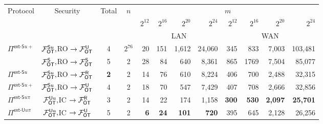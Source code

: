 \begin{figure*}[t!]\centering
	\begin{tabular}{|l||c|c|c || r | r|  r |r |r|r |r|r|}
		\hline
		\multirow{3}{*}{Protocol}  &         \multirow{3}{*}{Security}          & \multirow{3}{*}{Total} & \multirow{3}{*}{$n$} &                                     \multicolumn{8}{c|}{$m$}                                     \\
		                           &                                            &                        &                      & $2^{12}$ & $2^{16}$ & $2^{20}$ & $2^{24}$  & $2^{12}$  &  $2^{16}$ & $2^{20}$    &      $2^{24}$ \\ \cline{5-12}
		                           &                                            &         Rounds         &                      &          \multicolumn{4}{c|}{LAN}          &              \multicolumn{4}{c|}{WAN}               \\ \hline\hline
		$\Pi^{\textsf{ext-S}u+}$   &  $\mathcal{F}_{\mathsf{OT}}^{\mathsf{S} u},$RO $\rightarrow\mathcal{F}_{\mathsf{OT}}^\mathsf{U}$  &           4            &       $2^{76}$       & 20       & 151      & 1,612    & 24,060    & 345       &       833 & 7,003       &       103,481 \\ \hline\hline
		\cite{C:KelOrsSch15}       & $\mathcal{F}_{\mathsf{OT}}^{\mathsf{S}},$RO $\rightarrow\mathcal{F}_{\mathsf{OT}}^\mathsf{S}$  &           5            &          2           & 28       & 84       & 640      & 8,361     & 865       &      1769 & 7,504       &        85,077 \\ \hline
		$\Pi^{\textsf{ext-S}u}$    & $\mathcal{F}_{\mathsf{OT}}^{\mathsf{S} u},$RO $\rightarrow\mathcal{F}_{\mathsf{OT}}^\mathsf{R}$ &        {\bf 2}         &          2           & 14       & 76       & 610      & 8,224     & 406       &       700 & 2,488       &        32,315 \\ \hline
		$\Pi^{\textsf{ext-S}u+}$   &  $\mathcal{F}_{\mathsf{OT}}^{\mathsf{S} u},$RO $\rightarrow\mathcal{F}_{\mathsf{OT}}^\mathsf{U}$  &           4            &          2           & 18       & 70       & 547      & 7,429     & 407       &       708 & 2,666       &        32,856 \\ \hline\hline
		$\Pi^{\textsf{ext-S}u\pi}$ &  $\mathcal{F}_{\mathsf{OT}}^{\mathsf{U} u},$IC $\rightarrow\mathcal{F}_{\mathsf{OT}}^\mathsf{R}$   &           3            &          2           & 14       & 22       & 174      & 1,158     & {\bf 300} & {\bf 530} & {\bf 2,097} & {\bf  25,701} \\ \hline
		$\Pi^{\textsf{ext-U}u\pi}$ &   $\mathcal{F}_{\mathsf{OT}}^{\mathsf{U} u},$IC $\rightarrow\mathcal{F}_{\mathsf{OT}}^\mathsf{U}$    &           5            &          2           & {\bf6}   & {\bf24}  & {\bf101} & {\bf 720} & {395}     &    { 645} & {2,128}     &      {26,256} \\ \hline
	\end{tabular}
	\caption{ \label{fig:extTimes}}	
\end{figure*}



